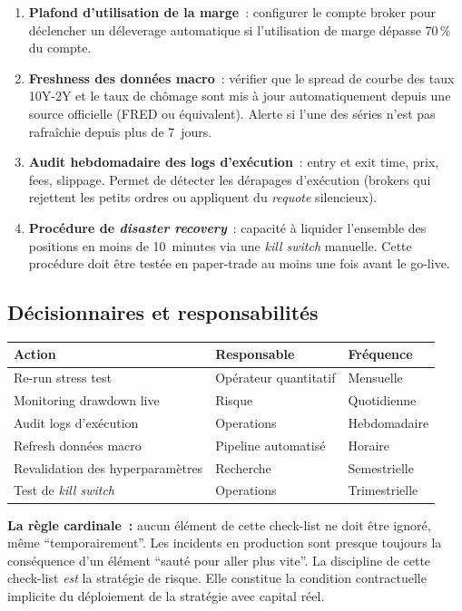 \begin{enumerate}[label=\color{primary}\textbf{\arabic*.}]
\item \textbf{Plafond d'utilisation de la marge}~: configurer le compte broker pour déclencher un déleverage automatique si l'utilisation de marge dépasse 70\,\% du compte.

\item \textbf{Freshness des données macro}~: vérifier que le spread de courbe des taux 10Y-2Y et le taux de chômage sont mis à jour automatiquement depuis une source officielle (FRED ou équivalent). Alerte si l'une des séries n'est pas rafraîchie depuis plus de 7~jours.

\item \textbf{Audit hebdomadaire des logs d'exécution}~: entry et exit time, prix, fees, slippage. Permet de détecter les dérapages d'exécution (brokers qui rejettent les petits ordres ou appliquent du \emph{requote} silencieux).

\item \textbf{Procédure de \emph{disaster recovery}}~: capacité à liquider l'ensemble des positions en moins de 10~minutes via une \emph{kill switch} manuelle. Cette procédure doit être testée en paper-trade au moins une fois avant le go-live.
\end{enumerate}

\subsection{Décisionnaires et responsabilités}

\begin{center}
\renewcommand{\arraystretch}{1.2}
\begin{tabular}{lll}
\toprule
\textbf{Action} & \textbf{Responsable} & \textbf{Fréquence} \\
\midrule
Re-run stress test & Opérateur quantitatif & Mensuelle \\
Monitoring drawdown live & Risque & Quotidienne \\
Audit logs d'exécution & Operations & Hebdomadaire \\
Refresh données macro & Pipeline automatisé & Horaire \\
Revalidation des hyperparamètres & Recherche & Semestrielle \\
Test de \emph{kill switch} & Operations & Trimestrielle \\
\bottomrule
\end{tabular}
\end{center}

\begin{insightbox}
\textbf{La règle cardinale~:} aucun élément de cette check-list ne doit être ignoré, même \enquote{temporairement}. Les incidents en production sont presque toujours la conséquence d'un élément \enquote{sauté pour aller plus vite}. La discipline de cette check-list \emph{est} la stratégie de risque. Elle constitue la condition contractuelle implicite du déploiement de la stratégie avec capital réel.
\end{insightbox}

